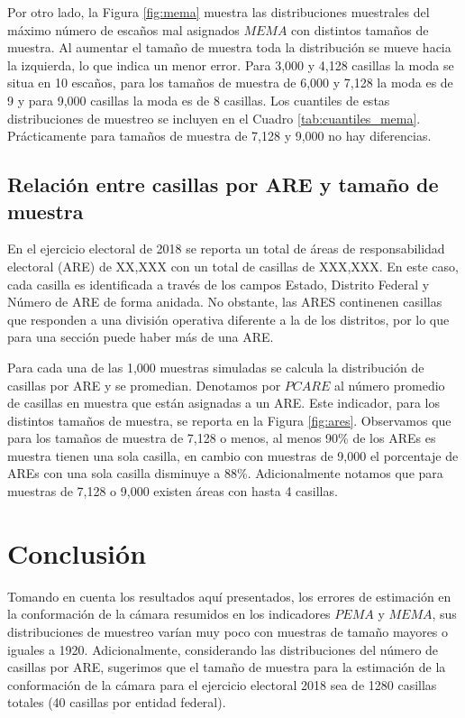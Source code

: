 \documentclass[]{article}
\let\rmarkdownfootnote\footnote%
\def\footnote{\protect\rmarkdownfootnote}
\begin{document}
Por otro lado, la Figura \ref{fig:mema} muestra las distribuciones muestrales del máximo número de escaños mal asignados $MEMA$ con distintos tamaños de muestra. Al aumentar el tamaño de muestra toda la distribución se mueve hacia la izquierda, lo que indica un menor error. Para 3,000 y 4,128 casillas la moda se situa en 10 escaños, para los tamaños de muestra de 6,000 y 7,128 la moda es de 9 y para 9,000 casillas la moda es de 8 casillas. Los cuantiles de estas distribuciones de muestreo se incluyen en el Cuadro \ref{tab:cuantiles_mema}. Prácticamente para tamaños de muestra de 7,128 y 9,000 no hay diferencias. 


\hypertarget{caes-casillas}{%
\subsection{Relación entre casillas por ARE y tamaño de muestra}}

En el ejercicio electoral de 2018 se reporta un total de áreas de responsabilidad electoral (ARE) de XX,XXX con un total de casillas de XXX,XXX. En este caso, cada casilla es identificada a través de los campos Estado, Distrito Federal y Número de ARE de forma anidada. No obstante, las ARES continenen casillas que responden a una división operativa diferente a la de los distritos, por lo que para una sección puede haber más de una ARE. %

Para cada una de las 1,000 muestras simuladas se calcula la distribución de casillas por ARE y se promedian. Denotamos por $PCARE$ al número promedio de casillas en muestra que están asignadas a un ARE. Este indicador, para los distintos tamaños de muestra, se reporta en la Figura \ref{fig:ares}. Observamos que para los tamaños de muestra de 7,128 o menos, al menos 90\% de los AREs es muestra tienen una sola casilla, en cambio con muestras de 9,000 el porcentaje de AREs con una sola casilla disminuye a 88\%. Adicionalmente notamos que para muestras de 7,128 o 9,000 existen áreas con hasta 4 casillas. 


\hypertarget{conclusión}{%
\section{Conclusión}
\label{conclusión}}

Tomando en cuenta los resultados aquí presentados, los errores de estimación en la conformación de la cámara resumidos en los indicadores $PEMA$ y $MEMA$, sus distribuciones de muestreo varían muy poco con muestras de tamaño mayores o iguales a 1920. Adicionalmente, considerando las distribuciones del número de casillas por ARE, sugerimos que el tamaño de muestra para la estimación de la conformación de la cámara para el ejercicio electoral 2018 sea de 1280 casillas totales (40 casillas por entidad federal). 
\end{document}
